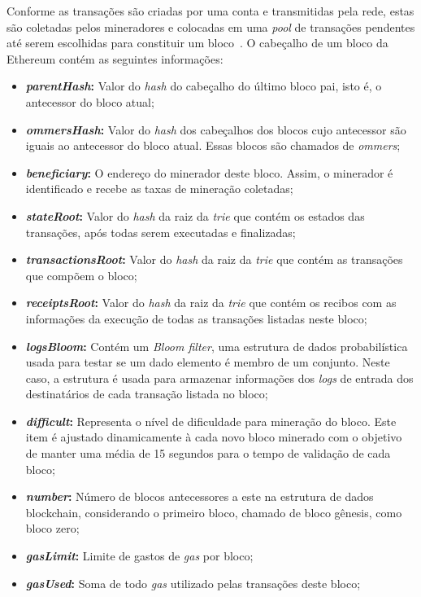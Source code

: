 Conforme as transações são criadas por uma conta e transmitidas pela rede, estas são coletadas pelos mineradores e colocadas em uma \textit{pool} de transações pendentes até serem escolhidas para constituir um bloco~\cite{wang2019detecting-nondeterministic-26}. O cabeçalho de um bloco da Ethereum contém as seguintes informações:
\begin{itemize}
    \item \textbf{\textit{parentHash}:} Valor do \textit{hash} do cabeçalho do último bloco pai, isto é, o antecessor do bloco atual;
    \item \textbf{\textit{ommersHash}:} Valor do \textit{hash} dos cabeçalhos dos blocos cujo antecessor são iguais ao antecessor do bloco atual. Essas blocos são chamados de \textit{ommers}; 
    \item \textbf{\textit{beneficiary}:} O endereço do minerador deste bloco. Assim, o minerador é identificado e recebe as taxas de mineração coletadas;
    \item \textbf{\textit{stateRoot}:} Valor do \textit{hash} da raiz da \textit{trie} que contém os estados das transações, após todas serem executadas e finalizadas; 
    \item \textbf{\textit{transactionsRoot}:} Valor do \textit{hash} da raiz da \textit{trie} que contém as transações que compõem o bloco; 
    \item \textbf{\textit{receiptsRoot}:} Valor do \textit{hash} da raiz da \textit{trie} que contém os recibos com as informações da execução de todas as transações listadas neste bloco;
    \item \textbf{\textit{logsBloom}:} Contém um \textit{Bloom filter}, uma estrutura de dados probabilística usada para testar se um dado elemento é membro de um conjunto. Neste caso, a estrutura é usada para armazenar informações dos \textit{logs} de entrada dos destinatários de cada transação listada no bloco;
    \item \textbf{\textit{difficult}:} Representa o nível de dificuldade para mineração do bloco. Este item é ajustado dinamicamente à cada novo bloco minerado com o objetivo de manter uma média de 15 segundos para o tempo de validação de cada bloco;
    \item \textbf{\textit{number}:} Número de blocos antecessores a este na estrutura de dados blockchain, considerando o primeiro bloco, chamado de bloco gênesis, como bloco zero;
    \item \textbf{\textit{gasLimit}:} Limite de gastos de \textit{gas} por bloco;
    \item \textbf{\textit{gasUsed}:} Soma de todo \textit{gas} utilizado pelas transações deste bloco;

\end{itemize}
